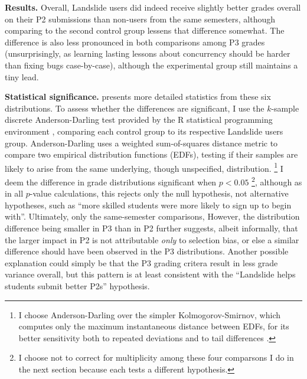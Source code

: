 {\bf Results.}
Overall,
Landslide users did indeed receive
slightly better grades overall on their P2 submissions than non-users from the same semesters,
although comparing to the second control group lessens that difference somewhat.
The difference is also less pronounced in both comparisons among P3 grades
(unsurprisingly, as learning lasting lessons about concurrency should be harder than fixing bugs case-by-case),
although the experimental group still maintains a tiny lead.

{\bf Statistical significance.}
 presents more detailed statistics from these six distributions.
To assess whether the differences are significant,
I use the $k$-sample discrete Anderson-Darling test \cite{anderson1952,anderson-darling}
provided by the R statistical programming environment \cite{r-lang,r-ksamples},
comparing each control group to its respective Landslide users group.
Anderson-Darling uses a weighted sum-of-squares distance metric to compare two empirical distribution functions (EDFs),
testing if their samples are likely to arise from the same underlying, though unspecified, distribution.%
\footnote{
I choose Anderson-Darling over the simpler Kolmogorov-Smirnov,
which computes only the maximum instantaneous distance between EDFs,
for its better sensitivity both to repeated deviations and to tail differences \cite{beware-kolmogorov-smirnov}.
}
I deem the difference in grade distributions significant when $p < 0.05$%
\footnote{I choose not to correct for multiplicity among these four comparsons  I do in the next section
because each tests a different hypothesis.
},
although as in all $p$-value calculations,
this rejects only the null hypothesis,
not alternative hypotheses,
such as ``more skilled students were more likely to sign up to begin with''.
%
Ultimately, only the same-semester comparisons,
However, the distribution difference being smaller in P3 than in P2
further suggests, albeit informally,
that the larger impact in P2 is not attributable {\em only} to selection bias,
or else a similar difference should have been observed in the P3 distributions.
Another possible explanation could simply be that the P3 grading critera result in less grade variance overall,
but this pattern is at least consistent with the ``Landslide helps students submit better P2s'' hypothesis.

